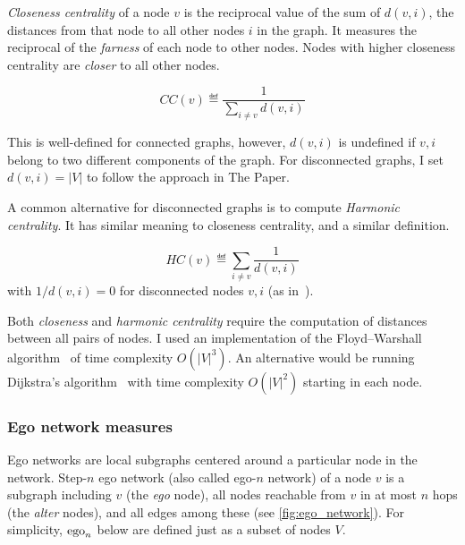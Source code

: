 \textsl{Closeness centrality} of a node $v$ is the reciprocal value of the sum of $d(v, i)$, the distances from that node to all other nodes $i$ in the graph.
It measures the reciprocal of the \textsl{farness} of each node to other nodes.
Nodes with higher closeness centrality are \textsl{closer} to all other nodes.

\begin{definition}\label{def:closeness_centrality}
    \[CC(v) \eqdef \frac{1}{\sum_{i \neq v} d(v, i)}\]
\end{definition}

This is well-defined for connected graphs, however, $d(v, i)$ is undefined if $v, i$ belong to two different components of the graph.
For disconnected graphs, I set $d(v, i) = \left\lvert V \right\rvert$ to follow the approach in The Paper.



A common alternative for disconnected graphs is to compute \textsl{Harmonic centrality}.
It has similar meaning to closeness centrality, and a similar definition.

\begin{definition}\label{def:harmonic_centrality}
    \[HC(v) \eqdef \sum_{i \neq v} \frac{1}{d(v, i)}\]
    with $1 / d(v, i) = 0$ for disconnected nodes $v, i$ (as in~\cite{MarchioriHarmonySmallworld2000}).
\end{definition}

Both \textsl{closeness} and \textsl{harmonic centrality} require the computation of distances between all pairs of nodes.
I used an implementation of the Floyd–Warshall algorithm~\cite{FloydAlgorithm97Shortest1962} of time complexity $O({\left\lvert V \right\rvert}^3)$.
An alternative would be running Dijkstra's algorithm~\cite{dijkstra1959note} with time complexity $O({\left\lvert V \right\rvert}^2)$ starting in each node.


\subsubsection{Ego network measures}

Ego networks are local subgraphs centered around a particular node in the network.
Step-$n$ ego network (also called ego-$n$ network) of a node $v$ is a subgraph including $v$ (the \textsl{ego} node), all nodes reachable from $v$ in at most $n$ hops (the \textsl{alter} nodes), and all edges among these (see \autoref{fig:ego_network}).
For simplicity, $\operatorname{ego}_n$ below are defined just as a subset of nodes $V$.


